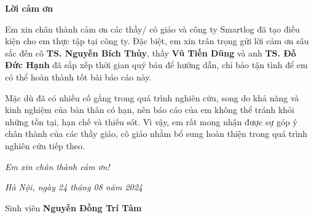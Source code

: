 \begin{center}
    \Large \textbf{Lời cảm ơn }
\end{center}

Em xin chân thành cảm ơn các thầy/ cô giáo và công ty Smartlog đã tạo điều kiện cho em thực tập tại công ty. Đặc biệt, em xin trân trọng gửi lời cảm ơn sâu sắc đến cô \textbf{TS. Nguyễn Bích Thủy}, thầy \textbf{Vũ Tiến Dũng} và anh \textbf{TS. Đỗ Đức Hạnh} đã sắp xếp thời gian quý báu để hướng dẫn, chỉ bảo tận tình để em có thể hoàn thành tốt bài báo cáo này. 

Mặc dù đã có nhiều cố gắng trong quá trình nghiên cứu, song do khả năng và kinh nghiệm của bản thân có hạn, nên báo cáo của em không thể tránh khỏi những tồn tại, hạn chế và thiếu sót. Vì vậy, em rất mong nhận được sự góp ý chân thành của các thầy giáo, cô giáo nhằm bổ sung hoàn thiện trong quá trình nghiên cứu tiếp theo.

\textit{Em xin chân thành cảm ơn!}

\begin{flushright}
	{\it Hà Nội, ngày 24 tháng 08 năm 2024}
	
	Sinh viên \hskip 2.5cm\quad
	\vskip 0.25cm
	\vskip 2.5cm
	\vskip 0.25cm
	{\bf Nguyễn Đồng Trí Tâm} \hskip 1cm \quad\ 
\end{flushright}

